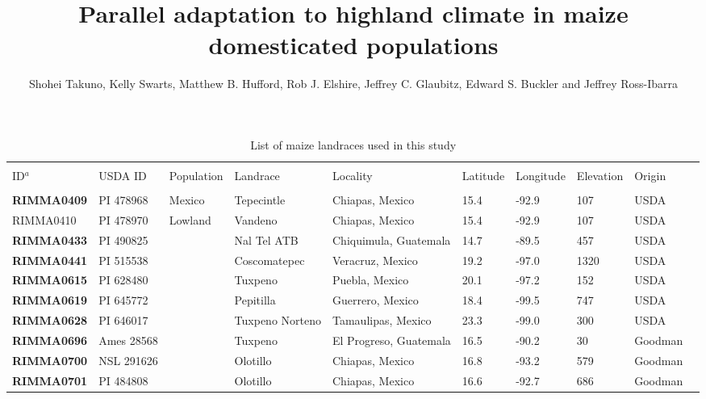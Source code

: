 \documentclass[onecolumn,oneside,letterpaper]{article}
\title{Parallel adaptation to highland climate in maize domesticated populations}
\author{
 Shohei Takuno, Kelly Swarts, Matthew B. Hufford, Rob J. Elshire, Jeffrey C. Glaubitz, Edward S. Buckler and Jeffrey Ross-Ibarra
   }
\begin{document}
\maketitle


\suppl



\renewcommand{\arraystretch}{1.2}

\begin{table}[h]
    \begin{center}
    \caption[]{List of maize landraces used in this study\hspace*{7.5cm}}  
{\fontsize{7}{10}\selectfont
    \begin{tabular}{llllllllll}
        \hline\hline
       & & & \\[-4mm] 
	 ID$^a$	&	USDA ID	&	Population	&	Landrace	&	Locality	&	Latitude	&	Longitude	&	Elevation	&	Origin	\\[0.0cm]
	\hline 
	& & & \\[-4mm] 
{\bf RIMMA0409}	&	PI 478968	&	Mexico 	&	Tepecintle	&	Chiapas, Mexico	&	15.4 	&	-92.9 	&	107	&	USDA	\\
RIMMA0410	&	PI 478970	&	Lowland	&	Vandeno	&	Chiapas, Mexico	&	15.4 	&	-92.9 	&	107	&	USDA	\\
{\bf RIMMA0433}	&	PI 490825	&		&	Nal Tel ATB	&	Chiquimula, Guatemala	&	14.7 	&	-89.5 	&	457	&	USDA	\\
{\bf RIMMA0441}	&	PI 515538	&		&	Coscomatepec	&	Veracruz, Mexico	&	19.2 	&	-97.0 	&	1320	&	USDA	\\
{\bf RIMMA0615}	&	PI 628480	&		&	Tuxpeno	&	Puebla, Mexico	&	20.1 	&	-97.2 	&	152	&	USDA	\\
{\bf RIMMA0619}	&	PI 645772	&		&	Pepitilla	&	Guerrero, Mexico	&	18.4 	&	-99.5 	&	747	&	USDA	\\
{\bf RIMMA0628}	&	PI 646017	&		&	Tuxpeno Norteno	&	Tamaulipas, Mexico	&	23.3 	&	-99.0 	&	300	&	USDA	\\
{\bf RIMMA0696}	&	Ames 28568	&		&	Tuxpeno	&	El Progreso, Guatemala	&	16.5 	&	-90.2 	&	30	&	Goodman	\\
{\bf RIMMA0700}	&	NSL 291626	&		&	Olotillo	&	Chiapas, Mexico	&	16.8 	&	-93.2 	&	579	&	Goodman	\\
{\bf RIMMA0701}	&	PI 484808	&		&	Olotillo	&	Chiapas, Mexico	&	16.6 	&	-92.7 	&	686	&	Goodman	\\

\end{tabular}}
\end{center}
\end{table}
\end{document}
